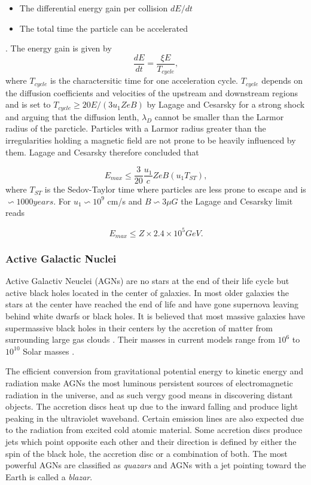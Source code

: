 \begin{itemize}
\item The differential energy gain per collision $dE/dt$
\item The total time the particle can be accelerated
\end{itemize}.
The energy gain is given by
\begin{equation}
\frac{dE}{dt} = \frac{\xi E}{T_{cycle}},
\end{equation}
where $T_{cycle}$ is the charactersitic time for one acceleration cycle. $T_{cycle}$ depends on the diffusion coefficients and velocities of the upstream and downstream regions and is set to $T_{cycle} \geq 20 E/(3 u_1 Z e B)$ by Lagage and Cesarsky \cite{Lagage:1983zz} for a strong shock and arguing that the diffusion lenth, $\lambda_D$ cannot be smaller than the Larmor radius of the parcticle. Particles with a Larmor radius greater than the irregularities holding a magnetic field are not prone to be heavily influenced by them. Lagage and Cesarsky therefore concluded that

\begin{equation}
E_{max} \leq \frac{3}{20} \frac{u_1}{c} Z e B (u_1 T_{ST}),
\end{equation}
where $T_{ST}$ is the Sedov-Taylor time where particles are less prone to escape and is $\backsim 1000 years$. For $u_1 \backsim 10^9$ cm/s \cite{stanev2010high}  and $B \backsim 3\mu G$ the Lagage and Cesarsky limit reads

\begin{equation}
E_{max} \leq Z \times 2.4 \times 10^5 GeV.
\end{equation}

\subsubsection{Active Galactic Nuclei}
Active Galactiv Neuclei (AGNs) are no stars at the end of their life cycle but active black holes located in the center of galaxies. In most older galaxies the stars at the center have reached the end of life and have gone supernova leaving behind white dwarfs or black holes. It is believed that most massive galaxies have supermassive black holes in their centers by the accretion of matter from surrounding large gas clouds \cite{Urry:1995mg,Antonucci:1993sg}. Their masses in current models range from $10^6$ to $10^{10}$ Solar masses \cite{Kazanas:2012sk}.

The efficient conversion from gravitational potential energy to kinetic energy and radiation make AGNs the most luminous persistent sources of electromagnetic radiation in the universe, and as such vergy good means in discovering distant objects. The accretion discs heat up due to the inward falling and produce light peaking in the ultraviolet waveband. Certain emission lines are also expected due to the radiation from excited cold atomic material. Some accretion discs produce jets which point opposite each other and their direction is defined by either the spin of the black hole, the accretion disc or a combination of both.  The most powerful AGNs are classified as \textit{quazars} and AGNs with a jet pointing toward the Earth is called a \textit{blazar}.

